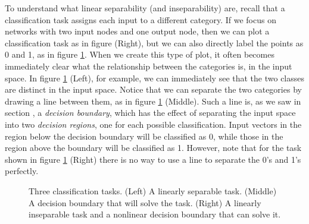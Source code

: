 To understand what linear separability (and inseparability) are, recall that a classification task assigns each input to a different category. If we focus on networks with two input nodes and one output node, then we can plot a classification task as in figure  (Right), but we can also directly label the points as 0 and 1, as in figure \ref{F:decisionBoundaries}. When we create this type of plot, it often becomes immediately clear what the relationship between the categories is, in the input space. In figure \ref{F:decisionBoundaries} (Left), for example, we can immediately see that the two classes are distinct in the input space. Notice that we can separate the two categories by drawing a line between them, as in figure \ref{F:decisionBoundaries} (Middle). Such a line is, as we saw in section , a \emph{decision boundary}, which has the effect of separating the input space into two \emph{decision regions}, one for each possible classification. Input vectors in the region below the decision boundary will be classified as 0, while those in the region above the boundary will be classified as 1. However, note that for the task shown in figure \ref{F:decisionBoundaries} (Right) there is no way to use a line to separate the 0's and 1's perfectly.

\begin{figure}[h]
\centering
{}
\hspace*{.4in}
\hspace*{.4in}
\caption[Jeff Yoshimi.]{Three classification tasks. (Left) A linearly separable task. (Middle) A decision boundary that will solve the task. (Right) A linearly inseparable task and a nonlinear decision boundary that can solve it.}
\label{F:decisionBoundaries}
\end{figure}

